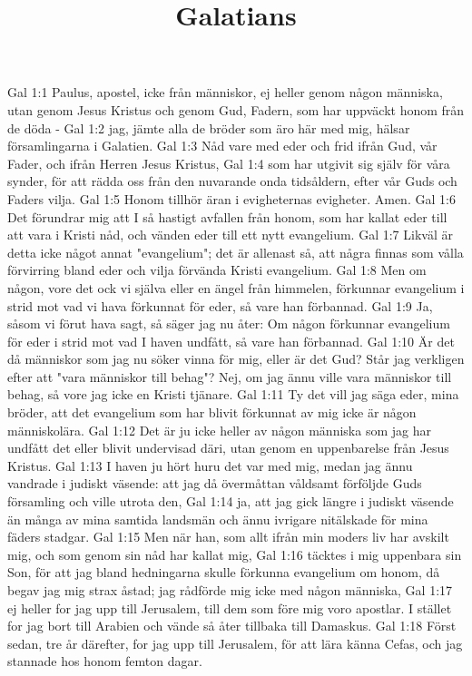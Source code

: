 

\title{Galatians}

Gal 1:1  Paulus, apostel, icke från människor, ej heller genom någon människa, utan genom Jesus Kristus och genom Gud, Fadern, som har uppväckt honom från de döda -
Gal 1:2  jag, jämte alla de bröder som äro här med mig, hälsar församlingarna i Galatien.
Gal 1:3  Nåd vare med eder och frid ifrån Gud, vår Fader, och ifrån Herren Jesus Kristus,
Gal 1:4  som har utgivit sig själv för våra synder, för att rädda oss från den nuvarande onda tidsåldern, efter vår Guds och Faders vilja.
Gal 1:5  Honom tillhör äran i evigheternas evigheter. Amen.
Gal 1:6  Det förundrar mig att I så hastigt avfallen från honom, som har kallat eder till att vara i Kristi nåd, och vänden eder till ett nytt evangelium.
Gal 1:7  Likväl är detta icke något annat "evangelium"; det är allenast så, att några finnas som vålla förvirring bland eder och vilja förvända Kristi evangelium.
Gal 1:8  Men om någon, vore det ock vi själva eller en ängel från himmelen, förkunnar evangelium i strid mot vad vi hava förkunnat för eder, så vare han förbannad.
Gal 1:9  Ja, såsom vi förut hava sagt, så säger jag nu åter: Om någon förkunnar evangelium för eder i strid mot vad I haven undfått, så vare han förbannad.
Gal 1:10  Är det då människor som jag nu söker vinna för mig, eller är det Gud? Står jag verkligen efter att "vara människor till behag"? Nej, om jag ännu ville vara människor till behag, så vore jag icke en Kristi tjänare.
Gal 1:11  Ty det vill jag säga eder, mina bröder, att det evangelium som har blivit förkunnat av mig icke är någon människolära.
Gal 1:12  Det är ju icke heller av någon människa som jag har undfått det eller blivit undervisad däri, utan genom en uppenbarelse från Jesus Kristus.
Gal 1:13  I haven ju hört huru det var med mig, medan jag ännu vandrade i judiskt väsende: att jag då övermåttan våldsamt förföljde Guds församling och ville utrota den,
Gal 1:14  ja, att jag gick längre i judiskt väsende än många av mina samtida landsmän och ännu ivrigare nitälskade för mina fäders stadgar.
Gal 1:15  Men när han, som allt ifrån min moders liv har avskilt mig, och som genom sin nåd har kallat mig,
Gal 1:16  täcktes i mig uppenbara sin Son, för att jag bland hedningarna skulle förkunna evangelium om honom, då begav jag mig strax åstad; jag rådförde mig icke med någon människa,
Gal 1:17  ej heller for jag upp till Jerusalem, till dem som före mig voro apostlar. I stället for jag bort till Arabien och vände så åter tillbaka till Damaskus.
Gal 1:18  Först sedan, tre år därefter, for jag upp till Jerusalem, för att lära känna Cefas, och jag stannade hos honom femton dagar.

